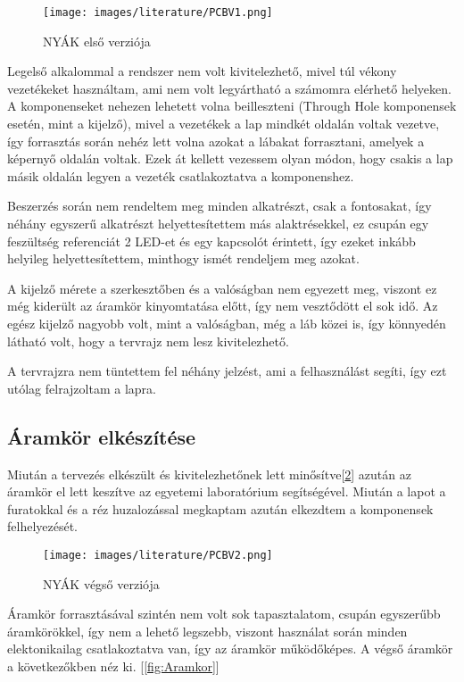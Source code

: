 \begin{figure}[h]
    \centering
    \texttt{[image: images/literature/PCBV1.png]}
    \caption{NYÁK első verziója}
    \label{fig:PCBV1}
\end{figure}

Legelső alkalommal a rendszer nem volt kivitelezhető, mivel túl vékony vezetékeket
használtam, ami nem volt legyártható a számomra elérhető helyeken. A komponenseket 
nehezen lehetett volna beilleszteni (Through Hole komponensek esetén, mint a kijelző),
mivel a vezetékek a lap mindkét oldalán voltak vezetve, így forrasztás során nehéz
lett volna azokat a lábakat forrasztani, amelyek a képernyő oldalán voltak.
Ezek át kellett vezessem olyan módon, hogy csakis a lap másik oldalán legyen a vezeték
csatlakoztatva a komponenshez.

Beszerzés során nem rendeltem meg minden alkatrészt, csak a fontosakat, így néhány
egyszerű alkatrészt helyettesítettem más alaktrésekkel, ez csupán egy feszültség referenciát
2 LED-et és egy kapcsolót érintett, így ezeket inkább helyileg helyettesítettem, minthogy
ismét rendeljem meg azokat.

A kijelző mérete a szerkesztőben és a valóságban nem egyezett meg, viszont ez még 
kiderült az áramkör kinyomtatása előtt, így nem vesztődött el sok idő. Az egész
kijelző nagyobb volt, mint a valóságban, még a láb közei is, így könnyedén látható
volt, hogy a tervrajz nem lesz kivitelezhető.

A tervrajzra nem tüntettem fel néhány jelzést, ami a felhasználást segíti, így ezt 
utólag felrajzoltam a lapra.

\subsection{Áramkör elkészítése}

Miután a tervezés elkészült és kivitelezhetőnek lett minősítve[\ref{fig:PCBV2}] azután az áramkör
el lett keszítve az egyetemi laboratórium segítségével. Miután a lapot a furatokkal és a réz
huzalozással megkaptam azután elkezdtem a komponensek felhelyezését.

\begin{figure}[h]
    \centering
    \texttt{[image: images/literature/PCBV2.png]}
    \caption{NYÁK végső verziója}
    \label{fig:PCBV2}
\end{figure}


Áramkör forrasztásával szintén nem volt sok tapasztalatom, csupán egyszerűbb
áramkörökkel, így nem a lehető legszebb, viszont használat során minden elektonikailag
csatlakoztatva van, így az áramkör működőképes. A végső áramkör a következőkben néz ki.
[\ref{fig:Aramkor}]


